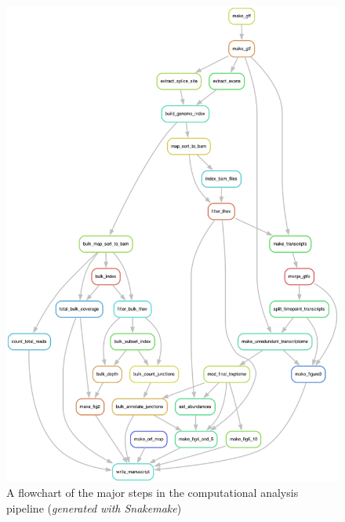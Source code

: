 \documentclass[
]{article}
\begin{document}
\begin{figure}
\centering
\includegraphics{project_map.png}
\caption{A flowchart of the major steps in the computational analysis
pipeline (\emph{generated with Snakemake})}
\end{figure}
\end{document}
